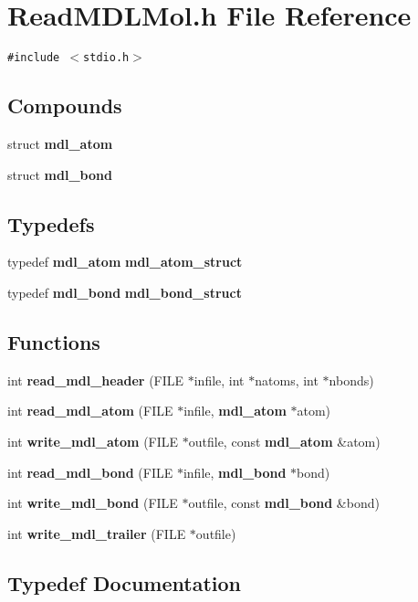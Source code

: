 \section{Read\-MDLMol.h File Reference}
\label{ReadMDLMol_8h}
{\tt \#include $<$stdio.h$>$}\par
\subsection*{Compounds}
\begin{CompactItemize}
\item 
struct {\bf mdl\_\-atom}
\item 
struct {\bf mdl\_\-bond}
\end{CompactItemize}
\subsection*{Typedefs}
\begin{CompactItemize}
\item 
typedef {\bf mdl\_\-atom} {\bf mdl\_\-atom\_\-struct}
\item 
typedef {\bf mdl\_\-bond} {\bf mdl\_\-bond\_\-struct}
\end{CompactItemize}
\subsection*{Functions}
\begin{CompactItemize}
\item 
int {\bf read\_\-mdl\_\-header} (FILE $\ast$infile, int $\ast$natoms, int $\ast$nbonds)
\item 
int {\bf read\_\-mdl\_\-atom} (FILE $\ast$infile, {\bf mdl\_\-atom} $\ast$atom)
\item 
int {\bf write\_\-mdl\_\-atom} (FILE $\ast$outfile, const {\bf mdl\_\-atom} \&atom)
\item 
int {\bf read\_\-mdl\_\-bond} (FILE $\ast$infile, {\bf mdl\_\-bond} $\ast$bond)
\item 
int {\bf write\_\-mdl\_\-bond} (FILE $\ast$outfile, const {\bf mdl\_\-bond} \&bond)
\item 
int {\bf write\_\-mdl\_\-trailer} (FILE $\ast$outfile)
\end{CompactItemize}


\subsection{Typedef Documentation}
